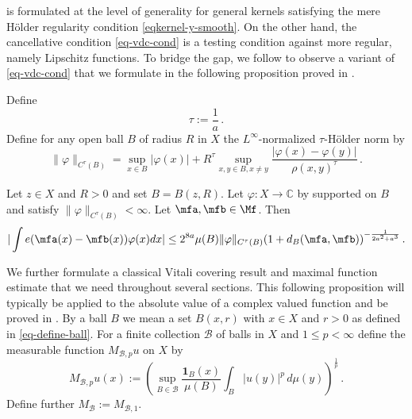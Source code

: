 is formulated at the level of generality
for general kernels satisfying the mere H\"older regularity condition \eqref{eqkernel-y-smooth}. On the other hand, the cancellative condition \eqref{eq-vdc-cond} is a testing condition against more regular,
namely Lipschitz functions. To bridge the gap, we follow \cite{zk-polynomial} to observe a variant of \eqref{eq-vdc-cond} that we formulate
in the following proposition proved in .


Define
\begin{equation}
    \tau:=\frac 1a\, .
\end{equation}
Define for any open ball $B$ of radius $R$ in $X$ the $L^\infty$-normalized $\tau$-H\"older norm by
\begin{equation}
    \label{eq-Holder-norm}
    \|\varphi\|_{C^\tau(B)} = \sup_{x \in B} |\varphi(x)| + R^\tau \sup_{x,y \in B, x \neq y} \frac{|\varphi(x) - \varphi(y)|}{\rho(x,y)^\tau}\,.
\end{equation}


\begin{proposition}
    \label{Holder-van-der-Corput}
    \leanok
     Let $z\in X$ and $R>0$ and set $B=B(z,R)$.
     Let $\varphi: X \to \mathbb{C}$ by
     supported on $B$ and satisfy $\|{\varphi}\|_{C^\tau(B)}<\infty$.
     Let $\mfa, \mfb \in \Mf$. Then
    \begin{equation}
        \label{eq-vdc-cond-tau-2}
        |\int e(\mfa(x)-{\mfb(x)})\varphi(x) dx|\le
         2^{8a} \mu(B) \|{\varphi}\|_{C^\tau(B)}
       (1 + d_{B}(\mfa,\mfb))^{-\frac{1}{2a^2+a^3}}
    \,.
    \end{equation}
\end{proposition}

We further formulate a classical Vitali covering result
and maximal function estimate that we need throughout several sections.
This following proposition will typically be applied to the absolute value of a complex valued function and be proved in . By a ball $B$ we mean a set $B(x,r)$ with $x\in X$
and $r>0$ as defined in \eqref{eq-define-ball}.
For a finite collection $\mathcal{B}$ of balls in $X$
and $1\le p< \infty$ define the measurable function $M_{\mathcal{B},p}u$ on $X$ by
\begin{equation}\label{def-hlm}
    M_{\mathcal{B},p}u(x):=\left(\sup_{B\in \mathcal{B}} \frac{\mathbf{1}_{B}(x)}{\mu(B)}\int _{B} |u(y)|^p\, d\mu(y)\right)^\frac 1p\, .
\end{equation}
Define further $M_{\mathcal{B}}:=M_{\mathcal{B},1}$.

